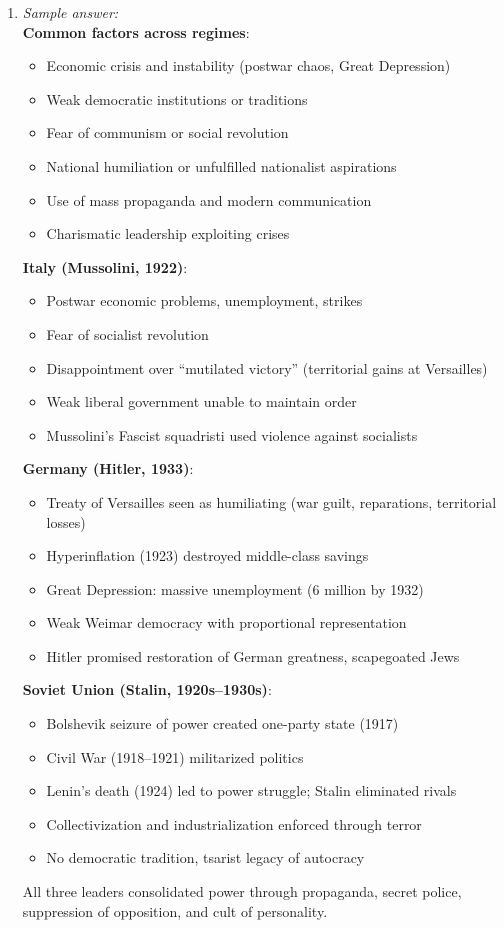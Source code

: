 \documentclass[11pt]{article}
\begin{document}
\begin{enumerate}[label=\textbf{\arabic*.}]
  These factors created a powder keg; the assassination provided the spark.

  \item \emph{Sample answer:}\\
  \textbf{Common factors across regimes}:
  \begin{itemize}
    \item Economic crisis and instability (postwar chaos, Great Depression)
    \item Weak democratic institutions or traditions
    \item Fear of communism or social revolution
    \item National humiliation or unfulfilled nationalist aspirations
    \item Use of mass propaganda and modern communication
    \item Charismatic leadership exploiting crises
  \end{itemize}

  \textbf{Italy (Mussolini, 1922)}:
  \begin{itemize}
    \item Postwar economic problems, unemployment, strikes
    \item Fear of socialist revolution
    \item Disappointment over ``mutilated victory'' (territorial gains at Versailles)
    \item Weak liberal government unable to maintain order
    \item Mussolini's Fascist squadristi used violence against socialists
  \end{itemize}

  \textbf{Germany (Hitler, 1933)}:
  \begin{itemize}
    \item Treaty of Versailles seen as humiliating (war guilt, reparations, territorial losses)
    \item Hyperinflation (1923) destroyed middle-class savings
    \item Great Depression: massive unemployment (6 million by 1932)
    \item Weak Weimar democracy with proportional representation
    \item Hitler promised restoration of German greatness, scapegoated Jews
  \end{itemize}

  \textbf{Soviet Union (Stalin, 1920s--1930s)}:
  \begin{itemize}
    \item Bolshevik seizure of power created one-party state (1917)
    \item Civil War (1918--1921) militarized politics
    \item Lenin's death (1924) led to power struggle; Stalin eliminated rivals
    \item Collectivization and industrialization enforced through terror
    \item No democratic tradition, tsarist legacy of autocracy
  \end{itemize}

  All three leaders consolidated power through propaganda, secret police, suppression of opposition, 
  and cult of personality.

\end{enumerate}
\end{document}
